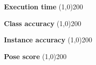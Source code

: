 \begin{flushleft}
\textbf{Execution time} \line(1,0){200}\\
\vspace{0.3cm}
\end{flushleft}

\begin{flushleft}
\textbf{Class accuracy} \line(1,0){200}\\
\vspace{0.3cm}
\end{flushleft}

\begin{flushleft}
\textbf{Instance accuracy} \line(1,0){200}\\
\vspace{0.3cm}
\end{flushleft}

\begin{flushleft}
\textbf{Pose score} \line(1,0){200}\\
\vspace{0.3cm}
\end{flushleft}





